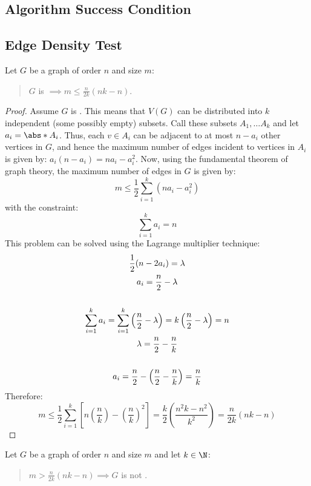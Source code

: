 \subsection{Algorithm Success Condition}

\subsection{Edge Density Test}

\begin{lemma}
  \label{lem:density}
  Let \(G\) be a graph of order \(n\) and size \(m\):
  \begin{quote}
    \(G\) is  \(\displaystyle\implies m\le\frac{n}{2k}(nk-n)\).
  \end{quote}
\end{lemma}

\begin{proof}
  Assume \(G\) is .  This means that \(V(G)\) can be distributed into \(k\) independent (some possibly empty)
  subsets.  Call these subsets \(A_1,\ldots A_k\) and let \(a_i=\abs*{A_i}\).  Thus, each \(v\in A_i\) can be adjacent to at
  most \(n-a_i\) other vertices in \(G\), and hence the maximum number of edges incident to vertices in \(A_i\) is given by:
  \(a_i(n-a_i)=na_i-a_i^2\).  Now, using the fundamental theorem of graph theory, the maximum number of edges in \(G\) is given
  by:
  \[m\le\frac{1}{2}\sum_{i=1}^k(na_i-a_i^2)\]
  with the constraint:
  \[\sum_{i=1}^ka_i=n\]
  This problem can be solved using the Lagrange multiplier technique:
  \begin{gather*}
    \frac{1}{2}(n-2a_i)=\lambda \\
    a_i=\frac{n}{2}-\lambda \\
    \\
    \sum_{i=1}^ka_i=\sum_{i=1}^k\left(\frac{n}{2}-\lambda\right)=k\left(\frac{n}{2}-\lambda\right)=n \\
    \lambda=\frac{n}{2}-\frac{n}{k} \\
    \\
    a_i=\frac{n}{2}-\left(\frac{n}{2}-\frac{n}{k}\right)=\frac{n}{k}
  \end{gather*}
  Therefore:
  \[m\le\frac{1}{2}\sum_{i=1}^k\left[n\left(\frac{n}{k}\right)-\left(\frac{n}{k}\right)^2\right]=
  \frac{k}{2}\left(\frac{n^2k-n^2}{k^2}\right)=\frac{n}{2k}(nk-n)\]
\end{proof}

\begin{corollary}
  \label{cor:density}
  Let \(G\) be a graph of order \(n\) and size \(m\) and let \(k\in\N\):
  \begin{quote}
    \(\displaystyle m>\frac{n}{2k}(nk-n)\implies G\) is not .
  \end{quote}
\end{corollary}

